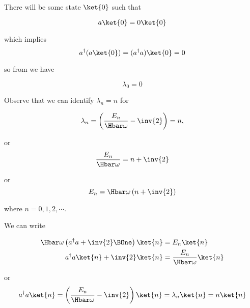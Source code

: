 There will be some state \(\ket{0}\) such that

\begin{equation}\label{eqn:PHY356FLecture11:120}
a \ket{0} = 0 \ket{0}
\end{equation}

which implies
\begin{equation}\label{eqn:PHY356FLecture11:130}
a^\dagger (a \ket{0}) = (a^\dagger a) \ket{0} = 0
\end{equation}

so from  we have

\begin{equation}\label{eqn:PHY356FLecture11:140}
\lambda_0 = 0
\end{equation}

Observe that we can identify \(\lambda_n = n\) for

\begin{equation}\label{eqn:PHY356FLecture11:150}
\lambda_n = \left( \frac{E_n}{\Hbar\omega} - \inv{2} \right) = n,
\end{equation}

or
\begin{equation}\label{eqn:PHY356FLecture11:155}
\frac{E_n}{\Hbar\omega} = n + \inv{2}
\end{equation}

or
\begin{equation}\label{eqn:PHY356FLecture11:160}
E_n = \Hbar \omega \left( n + \inv{2} \right)
\end{equation}

where \(n = 0, 1, 2, \cdots\).

We can write

\begin{equation}\label{eqn:lecture11harmonicOscillator:720}
\begin{aligned}
\Hbar \omega \left( a^\dagger a + \inv{2} \BOne \right) \ket{n} &= E_n \ket{n} \\
a^\dagger a \ket{n} + \inv{2} \ket{n} &= \frac{E_n}{\Hbar \omega} \ket{n} \\
\end{aligned}
\end{equation}

or
\begin{equation}\label{eqn:PHY356FLecture11:170}
a^\dagger a \ket{n} = \left( \frac{E_n}{\Hbar \omega} - \inv{2} \right) \ket{n} = \lambda_n \ket{n} = n \ket{n}
\end{equation}

